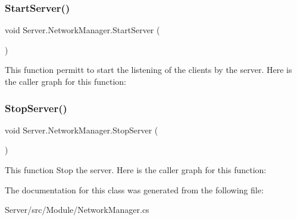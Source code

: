 \subsubsection{\texorpdfstring{Start\+Server()}{StartServer()}}
{\footnotesize\ttfamily void Server.\+Network\+Manager.\+Start\+Server (\begin{DoxyParamCaption}{ }\end{DoxyParamCaption})\hspace{0.3cm}{\ttfamily [inline]}}

This function permitt to start the listening of the clients by the server. Here is the caller graph for this function\+:
\mbox{\label{class_server_1_1_network_manager_a0402543b544a9688c3f0f73df5dbcdbd}} 
\subsubsection{\texorpdfstring{Stop\+Server()}{StopServer()}}
{\footnotesize\ttfamily void Server.\+Network\+Manager.\+Stop\+Server (\begin{DoxyParamCaption}{ }\end{DoxyParamCaption})\hspace{0.3cm}{\ttfamily [inline]}}

This function Stop the server. Here is the caller graph for this function\+:


The documentation for this class was generated from the following file\+:\begin{DoxyCompactItemize}
\item 
Server/src/\+Module/Network\+Manager.\+cs\end{DoxyCompactItemize}
